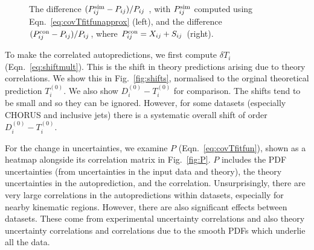  \begin{figure}[h]
    \begin{center}
   \end{center}
  \vspace{-0.55cm}
  \caption{The difference $(P^{\rm sim}_{ij}-P_{ij})/P_{ij}$ , with $P^{\rm sim}_{ij}$ computed using Eqn.~\ref{eq:covTfitfunapprox} (left), and the difference $(P^{\rm con}_{ij}-P_{ij})/P_{ij}$, where $P^{\rm con}_{ij}=X_{ij}+S_{ij}$ (right).}
 \label{fig:PminA}
\end{figure}

To make the correlated autopredictions, we first compute $\delta T_i$ (Eqn.~\ref{eq:shiftmult}). This is the shift in theory predictions arising due to theory correlations. We show this in Fig.~\ref{fig:shifts}, normalised to the orginal theoretical prediction $T^{(0)}_i$. We also show $D_i^{(0)}-T_i^{(0)}$ for comparison. The shifts tend to be small and so they can be ignored. However, for some datasets (especially CHORUS and inclusive jets) there is a systematic overall shift of order $D_i^{(0)}-T_i^{(0)}$.

For the change in uncertainties, we examine $P$ (Eqn.~\ref{eq:covTfitfun}), shown as a heatmap alongside its correlation matrix in Fig.~\ref{fig:P}. $P$ includes the PDF uncertainties (from uncertainties in the input data and theory), the theory uncertainties in the autoprediction, and the correlation. Unsurprisingly, there are very large correlations in the autopredictions within datasets, especially for nearby kinematic regions. However, there are also significant effects between datasets. These come from experimental uncertainty correlations and also theory uncertainty correlations and correlations due to the smooth PDFs which underlie all the data.

